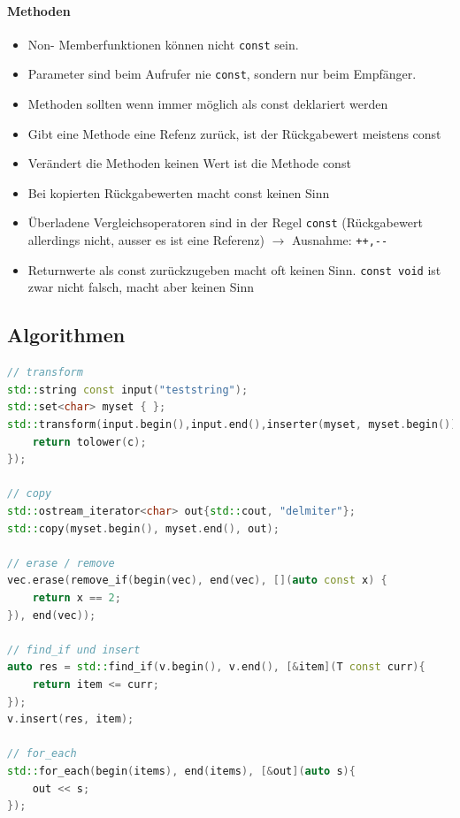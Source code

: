 \paragraph{Methoden}
\begin{itemize}
	\item Non- Memberfunktionen können nicht \lstinline|const| sein.
	\item Parameter sind beim Aufrufer nie \lstinline|const|, sondern nur beim Empfänger.
	\item Methoden sollten wenn immer möglich als const deklariert werden
	\item Gibt eine Methode eine Refenz zurück, ist der Rückgabewert meistens const
	\item Verändert die Methoden keinen Wert ist die Methode const
	\item Bei kopierten Rückgabewerten macht const keinen Sinn
	\item Überladene Vergleichsoperatoren sind in der Regel \lstinline|const| (Rückgabewert allerdings nicht, ausser es ist eine Referenz) $\rightarrow$ Ausnahme: \lstinline|++,--|
	\item Returnwerte als const zurückzugeben macht oft keinen Sinn. \lstinline|const void| ist zwar nicht falsch, macht aber keinen Sinn
\end{itemize}



\subsection{Algorithmen}
\begin{lstlisting}[language=C++]
// transform
std::string const input("teststring");
std::set<char> myset { };
std::transform(input.begin(),input.end(),inserter(myset, myset.begin()), [](char const c) {
	return tolower(c);
});

// copy
std::ostream_iterator<char> out{std::cout, "delmiter"};
std::copy(myset.begin(), myset.end(), out);

// erase / remove
vec.erase(remove_if(begin(vec), end(vec), [](auto const x) {
	return x == 2;
}), end(vec));

// find_if und insert
auto res = std::find_if(v.begin(), v.end(), [&item](T const curr){
	return item <= curr;
});
v.insert(res, item);

// for_each
std::for_each(begin(items), end(items), [&out](auto s){
	out << s;
});
\end{lstlisting}

